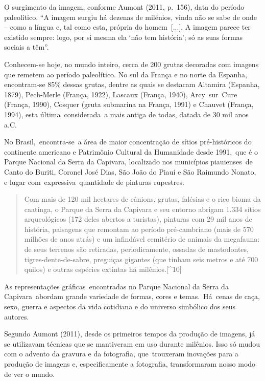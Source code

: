 \documentclass[
  letterpaper,
]{abntex2}
\begin{document}
O surgimento da imagem, conforme Aumont (2011, p.~156), data do período
paleolítico. ``A imagem surgiu há dezenas de milénios, vinda não se sabe
de onde -- como a língua e, tal como esta, própria do homem~{[}...{]}. A
imagem parece ter existido sempre: logo, por si mesma ela `não tem
história'; só as suas formas sociais a têm''.~

Conhecem-se hoje, no mundo inteiro, cerca de 200 grutas decoradas com
imagens que remetem ao período paleolítico. No sul da França e no norte
da Espanha, encontram-se 85\% dessas grutas, dentre as quais se destacam
Altamira (Espanha, 1879), Pech-Merle (França, 1922), Lascaux (França,
1940), Arcy~sur~Cure (França, 1990), Cosquer (gruta submarina na França,
1991) e Chauvet (França, 1994), esta última~considerada~a mais antiga de
todas, datada de 30 mil anos a.C.

No Brasil,~encontra-se~a área de maior concentração de sítios
pré-históricos do continente americano e Patrimônio Cultural da
Humanidade desde 1991,~que é o Parque Nacional da Serra da Capivara,
localizado nos municípios piauienses~de Canto do Buriti, Coronel José
Dias, São João do Piauí e São Raimundo Nonato, e lugar
com~expressiva~quantidade de pinturas rupestres.~ ~

\begin{quote}
Com mais de 120 mil hectares de cânions, grutas, falésias e o rico bioma
da caatinga, o Parque da Serra da Capivara e seu entorno abrigam 1.334
sítios arqueológicos (172 deles abertos a turistas), pinturas com 29 mil
anos de história, paisagens que remontam ao período pré-cambriano (mais
de 570 milhões de anos atrás) e um infindável cemitério de animais da
megafauna: de seus terrenos são retiradas, periodicamente, ossadas de
mastodontes, tigres-dente-de-sabre, preguiças gigantes (que tinham seis
metros e até 700 quilos) e outras espécies extintas há
milênios.{[}\^{}10{]} ~
\end{quote}

As representações gráficas~encontradas no Parque Nacional da Serra da
Capivara~abordam grande variedade de formas, cores e temas.~Há~cenas de
caça, sexo, guerra e aspectos da vida cotidiana e do universo simbólico
dos seus autores.~

Segundo Aumont (2011), desde os primeiros tempos da produção de imagens,
já se utilizavam técnicas que se mantiveram em uso durante milênios.
Isso só mudou com o advento da gravura e da fotografia, que~trouxeram
inovações para a produção de imagens e, especificamente a fotografia,
transformaram nosso modo de ver o mundo.~
\end{document}
